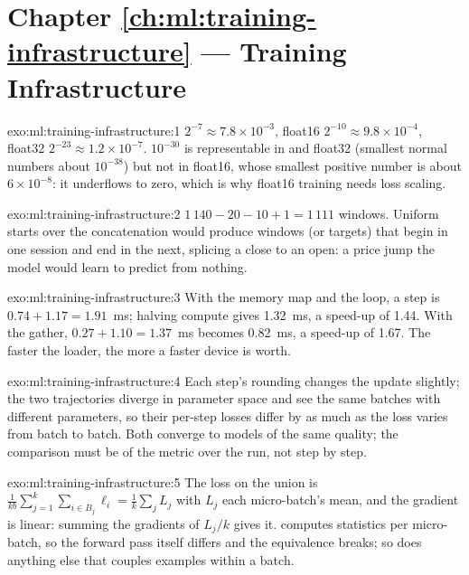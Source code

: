\section*{Chapter \ref{ch:ml:training-infrastructure} --- Training Infrastructure}

\begin{solution}{exo:ml:training-infrastructure:1}
 $2^{-7}\approx7.8\times10^{-3}$, float16 $2^{-10}\approx9.8\times10^{-4}$, float32 $2^{-23}\approx1.2\times10^{-7}$.
$10^{-30}$ is representable in  and float32 (smallest normal numbers about $10^{-38}$) but not in float16, whose
smallest positive number is about $6\times10^{-8}$: it underflows to zero, which is why float16 training needs loss scaling.
\end{solution}

\begin{solution}{exo:ml:training-infrastructure:2}
$1\,140 - 20 - 10 + 1 = 1\,111$ windows. Uniform starts over the concatenation would produce windows (or targets) that begin in one
session and end in the next, splicing a close to an open: a price jump the model would learn to predict from nothing.
\end{solution}

\begin{solution}{exo:ml:training-infrastructure:3}
With the memory map and the loop, a step is $0.74 + 1.17 = 1.91$~ms; halving compute gives 1.32~ms, a speed-up of 1.44. With the
gather, $0.27 + 1.10 = 1.37$~ms becomes 0.82~ms, a speed-up of 1.67. The faster the loader, the more a faster device is worth.
\end{solution}

\begin{solution}{exo:ml:training-infrastructure:4}
Each step's rounding changes the update slightly; the two trajectories diverge in parameter space and see the same batches with
different parameters, so their per-step losses differ by as much as the loss varies from batch to batch. Both converge to
models of the same quality; the comparison must be of the metric over the run, not step by step.
\end{solution}

\begin{solution}{exo:ml:training-infrastructure:5}
The loss on the union is $\frac1{kb}\sum_{j=1}^k\sum_{i\in B_j}\ell_i = \frac1k\sum_jL_j$ with $L_j$ each micro-batch's mean, and
the gradient is linear: summing the gradients of $L_j/k$ gives it.  computes statistics per micro-batch, so the
forward pass itself differs and the equivalence breaks; so does anything else that couples examples within a batch.
\end{solution}

